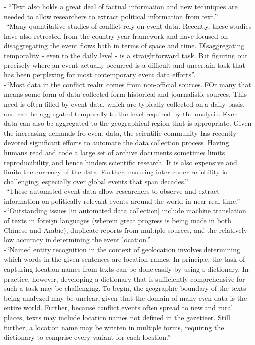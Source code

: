 - {\color{orange} “Text also holds a great deal of factual information and new techniques are needed to allow researchers to extract political information from text.”\cite{Halterman2019}}\\
-{\color{orange}“Many quantitative studies of conflict rely on event data. Recently, these studies have also retreated from the country-year framework and have focused on disaggregating the event flows both in terms of space and time. DIsaggregating temporality - even to the daily level - is a straightforward task. But figuring out precisely where an event actually occurred is a difficult and uncertain task that has been perplexing for most contemporary event data efforts”.\cite{Lee2019}}\\
-{\color{orange}“Most data in the conflict realm comes from non-official sources. FOr many that means some form of data collected form historical and journalistic sources. This need is often filled by event data, which are typically collected on a daily basis, and can be aggregated temporally to the level required by the analysis. Even data can also be aggregated to the geographical region that is appropriate. Given the increasing demands fro event data, the scientific community has recently devoted significant efforts to automate the data collection process. Having humans read and code a large set of archive documents sometimes limits reproducibility, and hence hinders scientific research. It is also expensive and limits the currency of the data. Further, ensuring inter-coder reliability is challenging, especially over global events that span decades.”\cite{Lee2019}}\\
-{\color{orange}“These automated event data allow researchers to observe and extract information on politically relevant events around the world in near real-time.”\cite{Lee2019}}\\
-{\color{orange}“Outstanding issues [in automated data collection] include machine translation of texts in foreign languages (wherein great progress is being made in both Chinese and Arabic), duplicate reports from multiple sources, and the relatively low accuracy in determining the event location.”\cite{Lee2019}}\\
-{\color{orange}“Named entity recognition in the context of geolocation involves determining which words in the given sentences are location names. In principle, the task of capturing location names from texts can be done easily by using a dictionary. In practice, however, developing a dictionary that is sufficiently comprehensive for such a task may be challenging. To begin, the geographic boundary of the texts being analyzed may be unclear, given that the domain of many even data is the entire world. Further, because conflict events often spread to new and rural places, texts may include location names not defined in the gazetteer. Still further, a location name may be written in multiple forms, requiring the dictionary to comprise every variant for each location.”\cite{Lee2019}}\\
